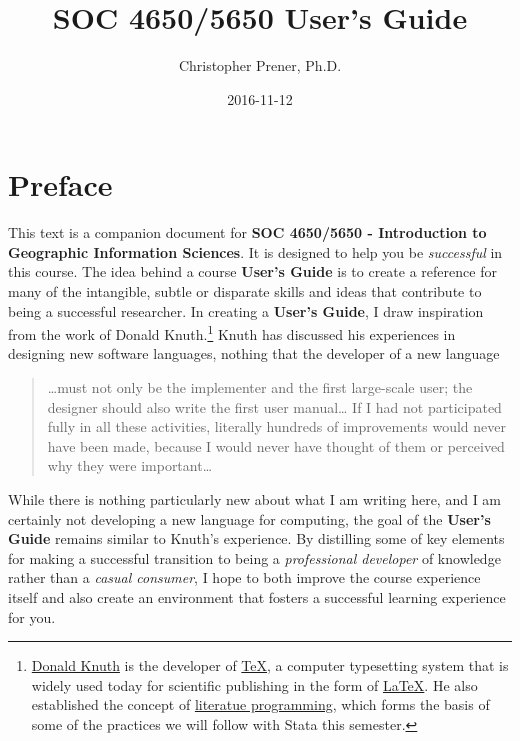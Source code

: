 \documentclass[]{book}
\title{SOC 4650/5650 User's Guide}
\author{Christopher Prener, Ph.D.}
\date{2016-11-12}
\let\rmarkdownfootnote\footnote%
\def\footnote{\protect\rmarkdownfootnote}
\begin{document}
\maketitle

{
\setcounter{tocdepth}{1}
\tableofcontents
}
\chapter*{Preface}\label{preface}

This text is a companion document for \textbf{SOC 4650/5650 -
Introduction to Geographic Information Sciences}. It is designed to help
you be \emph{successful} in this course. The idea behind a course
\textbf{User's Guide} is to create a reference for many of the
intangible, subtle or disparate skills and ideas that contribute to
being a successful researcher. In creating a \textbf{User's Guide}, I
draw inspiration from the work of Donald Knuth.\footnote{\href{https://en.wikipedia.org/wiki/Donald_Knuth}{Donald
  Knuth} is the developer of
  \href{https://en.wikipedia.org/wiki/TeX}{TeX}, a computer typesetting
  system that is widely used today for scientific publishing in the form
  of \href{https://en.wikipedia.org/wiki/LaTeX}{LaTeX}. He also
  established the concept of
  \href{https://en.wikipedia.org/wiki/Literate_programming}{literatue
  programming}, which forms the basis of some of the practices we will
  follow with Stata this semester.} Knuth has discussed his experiences
in designing new software languages, nothing that the developer of a new
language

\begin{quote}
\ldots{}must not only be the implementer and the first large-scale user;
the designer should also write the first user manual\ldots{} If I had
not participated fully in all these activities, literally hundreds of
improvements would never have been made, because I would never have
thought of them or perceived why they were important\ldots{}
\end{quote}

While there is nothing particularly new about what I am writing here,
and I am certainly not developing a new language for computing, the goal
of the \textbf{User's Guide} remains similar to Knuth's experience. By
distilling some of key elements for making a successful transition to
being a \emph{professional developer} of knowledge rather than a
\emph{casual consumer}, I hope to both improve the course experience
itself and also create an environment that fosters a successful learning
experience for you.
\end{document}
